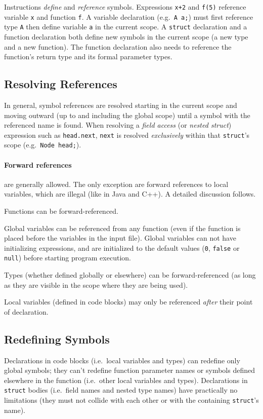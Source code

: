 \documentclass[a4paper]{article}
\begin{document}
Instructions \emph{define} and \emph{reference} symbols.
Expressions \verb=x+2= and \verb=f(5)=
reference variable \verb=x= and function \verb=f=.
A variable declaration (e.g.\ \verb=A a;=) must first reference type \verb=A=
then define variable \verb=a= in the current scope.
A \verb=struct= declaration and a function declaration both
define new symbols in the current scope (a new type and a new function).
The function declaration also needs to reference
the function's return type and its formal parameter types.


\subsection{Resolving References}
In general, symbol references are resolved starting in the current scope
and moving outward (up to and including the global scope)
until a symbol with the referenced name is found.
When resolving a \emph{field access} (or \emph{nested struct}) expression
such as \verb=head.next=,
\verb=next= is resolved \emph{exclusively} within that \verb=struct='s scope
(e.g.\ \verb=Node head;=).

\paragraph{Forward references}
are generally allowed.
The only exception are forward references to local variables, which are illegal
(like in Java and C++).
A detailed discussion follows.

Functions can be forward-referenced.

Global variables can be referenced from any function
(even if the function is placed before the variables in the input file).
Global variables can not have initializing expressions,
and are initialized to the default values
(\verb=0=, \verb=false= or \verb=null=)
before starting program execution.

Types (whether defined globally or elsewhere) can be forward-referenced
(as long as they are visible in the scope where they are being used).

Local variables (defined in code blocks) may only be referenced
\emph{after} their point of declaration.


\subsection{Redefining Symbols}

Declarations in code blocks (i.e.\ local variables and types)
can redefine only global symbols; they can't redefine
function parameter names or symbols defined elsewhere in the function
(i.e.\ other local variables and types).
Declarations in \verb=struct= bodies (i.e.\ field names and nested type names)
have practically no limitations
(they must not collide with each other
or with the containing \verb=struct='s name).
\end{document}

